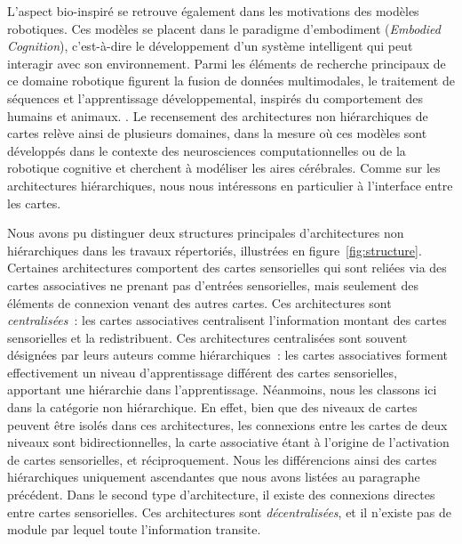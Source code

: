 \documentclass[../main]{subfiles}
\begin{document}
L'aspect bio-inspiré se retrouve également dans les motivations des modèles robotiques. Ces modèles se placent dans le paradigme d'embodiment (\emph{Embodied Cognition}), c'est-à-dire le développement d'un système intelligent qui peut interagir avec son environnement. Parmi les éléments de recherche principaux de ce domaine robotique figurent la fusion de données multimodales, le traitement de séquences et l'apprentissage développemental, inspirés du comportement des humains et animaux. \parencite{Smith2005TheDO}.
Le recensement des architectures non hiérarchiques de cartes relève ainsi de plusieurs domaines, dans la mesure où ces modèles sont développés dans le contexte des neurosciences computationnelles ou de la robotique cognitive et cherchent à modéliser les aires cérébrales. 
Comme sur les architectures hiérarchiques, nous nous intéressons en particulier à l'interface entre les cartes.


Nous avons pu distinguer deux structures principales d'architectures non hiérarchiques dans les travaux répertoriés, illustrées en figure~\ref{fig:structure}.
Certaines architectures comportent des cartes sensorielles qui sont reliées via des cartes associatives ne prenant pas d'entrées sensorielles, mais seulement des éléments de connexion venant des autres cartes. 
Ces architectures sont \emph{centralisées}~: les cartes associatives centralisent l'information montant des cartes sensorielles et la redistribuent. Ces architectures centralisées sont souvent désignées par leurs auteurs comme hiérarchiques~: les cartes associatives forment effectivement un niveau d'apprentissage différent des cartes sensorielles, apportant une hiérarchie dans l'apprentissage. 
Néanmoins, nous les classons ici dans la catégorie non hiérarchique. 
En effet, bien que des niveaux de cartes peuvent être isolés dans ces architectures, les connexions entre les cartes de deux niveaux sont bidirectionnelles, la carte associative étant à l'origine de l'activation de cartes sensorielles, et réciproquement.
Nous les différencions ainsi des cartes hiérarchiques uniquement ascendantes que nous avons listées au paragraphe précédent.
Dans le second type d'architecture, il existe des connexions directes entre cartes sensorielles. Ces architectures sont \emph{décentralisées}, et il n'existe pas de module par lequel toute l'information transite.
\end{document}

